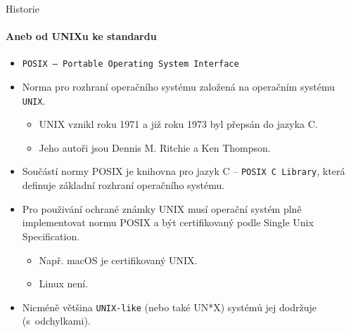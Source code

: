 \documentclass[handout]{beamer}
\begin{document}
\begin{frame}{Historie}
    \framesubtitle{Aneb od UNIXu ke standardu}
    \begin{itemize}
        \item \texttt{POSIX -- Portable Operating System Interface}
        \item Norma pro rozhraní operačního systému založená na operačním systému \texttt{UNIX}.
            \begin{itemize}
                \item UNIX vznikl roku 1971 a již roku 1973 byl přepsán do jazyka C.
                \item Jeho autoři jsou Dennis M. Ritchie a Ken Thompson.
            \end{itemize}
        \item Součástí normy POSIX je knihovna pro jazyk C -- \texttt{POSIX C Library}, která definuje základní rozhraní operačního systému.
        \item Pro použivání ochrané známky UNIX musí operační systém plně implementovat normu POSIX a být certifikovaný podle Single Unix Specification.
            \begin{itemize}
                \item Např. macOS je certifikovaný UNIX.
                \item Linux není.
            \end{itemize}
        \item Nicméně většina \texttt{UNIX-like} (nebo také UN*X) systémů jej dodržuje (s~odchylkami).
    \end{itemize}
\end{frame}
\end{document}
